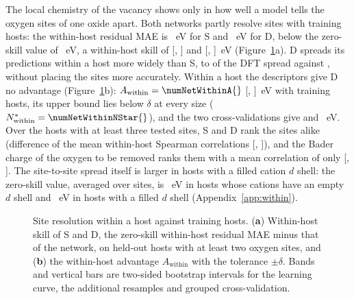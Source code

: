 The local chemistry of the vacancy shows only in how well a model tells the oxygen sites of one oxide apart. Both networks partly resolve sites with \numCfgBudgetsMax{} training hosts: the within-host residual MAE is \numCOneCTwoVTwoMaeSixHundredFiftyFourSWithinHostMaeMean{}~eV for S and \numCOneCTwoVTwoMaeSixHundredFiftyFourDStateWithinHostMaeMean{}~eV for D, below the zero-skill value of \numHostMeanOracleAggregateWithinHostMaeMean{}~eV, a within-host skill of \numCOneCTwoVTwoMaeSixHundredFiftyFourSWithinHostSkillMean{} [\numCOneCTwoVTwoMaeSixHundredFiftyFourSWithinHostSkillCiLo{}, \numCOneCTwoVTwoMaeSixHundredFiftyFourSWithinHostSkillCiHi{}] and \numCOneCTwoVTwoMaeSixHundredFiftyFourDStateWithinHostSkillMean{} [\numCOneCTwoVTwoMaeSixHundredFiftyFourDStateWithinHostSkillCiLo{}, \numCOneCTwoVTwoMaeSixHundredFiftyFourDStateWithinHostSkillCiHi{}]~eV (Figure~\ref{fig:within_host}a). D spreads its predictions within a host more widely than S, to \numNetSpreadRatioDSixHundredFiftyFour{} of the DFT spread against \numNetSpreadRatioSSixHundredFiftyFour{}, without placing the sites more accurately. Within a host the descriptors give D no advantage (Figure~\ref{fig:within_host}b): $A_\mathrm{within} = \numNetWithinA{}$ [\numNetWithinALo{}, \numNetWithinAHi{}]~eV with \numCfgBudgetsMax{} training hosts, its upper bound lies below $\delta$ at every size ($N^{*}_\mathrm{within} = \numNetWithinNStar{}$), and the two cross-validations give \numCvExtendedBudgetVTwoKTenAWithinMean{} and \numCvExtendedBudgetVTwoKTwentyAWithinMean{}~eV. Over the \numNetWithinSpearmanHosts{} hosts with at least three tested sites, S and D rank the sites alike (difference of the mean within-host Spearman correlations \numNetWithinSpearmanSMinusD{} [\numNetWithinSpearmanSMinusDLo{}, \numNetWithinSpearmanSMinusDHi{}]), and the Bader charge of the oxygen to be removed ranks them with a mean correlation of only \numWithinHostBreakdownSpearmanReferenceBaderChargeMean{} [\numWithinHostBreakdownSpearmanReferenceBaderChargeCiNinetyFiveItemOne{}, \numWithinHostBreakdownSpearmanReferenceBaderChargeCiNinetyFiveItemTwo{}]. The site-to-site spread itself is larger in hosts with a filled cation $d$ shell: the zero-skill value, averaged over sites, is \numWithinHostBreakdownGroupsDClassDZeroVTwoSZeroSkillMaePoint{}~eV in hosts whose cations have an empty $d$ shell and \numWithinHostBreakdownGroupsDClassDTenVTwoSZeroSkillMaePoint{}~eV in hosts with a filled $d$ shell (Appendix~\ref{app:within}).

\begin{figure}[H]
\centering
{}
\caption{Site resolution within a host against training hosts. (\textbf{a}) Within-host skill of S and D, the zero-skill within-host residual MAE minus that of the network, on held-out hosts with at least two oxygen sites, and (\textbf{b}) the within-host advantage $A_\mathrm{within}$ with the tolerance $\pm\delta$. Bands and vertical bars are two-sided bootstrap intervals for the learning curve, the additional resamples and grouped cross-validation.\label{fig:within_host}}
\end{figure}

